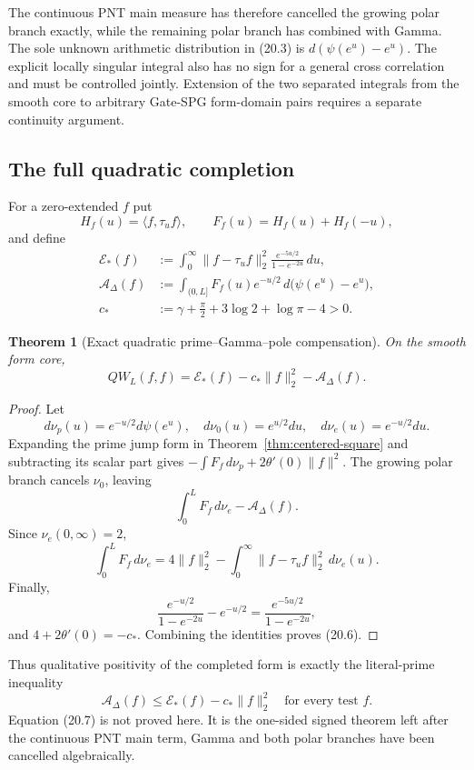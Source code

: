 \documentclass[11pt]{amsart}
\newtheorem{theorem}{Theorem}[section]
\theoremstyle{definition}
\theoremstyle{remark}
\begin{document}
The continuous PNT main measure has therefore cancelled the growing polar
branch exactly, while the remaining polar branch has combined with Gamma.
The sole unknown arithmetic distribution in (20.3) is
\(d(\psi(e^u)-e^u)\).  The explicit locally singular integral also has no
sign for a general cross correlation and must be controlled jointly.
Extension of the two separated integrals from the smooth core to arbitrary
Gate-SPG form-domain pairs requires a separate continuity argument.

\subsection*{The full quadratic completion}

For a zero-extended \(f\) put
\[
 H_f(u)=\langle f,\tau_uf\rangle,
 \qquad F_f(u)=H_f(u)+H_f(-u),
\]
and define
\[
\begin{aligned}
 \mathcal E_*(f)
 &:=
 \int_0^\infty\|f-\tau_uf\|_2^2
 \frac{e^{-5u/2}}{1-e^{-2u}}\,du,\\
 \mathcal A_\Delta(f)
 &:=
 \int_{(0,L]}F_f(u)e^{-u/2}\,
 d\bigl(\psi(e^u)-e^u\bigr),\\
 c_*&:=\gamma+\frac\pi2+3\log2+\log\pi-4>0.
\end{aligned}
\tag{20.5}
\]

\begin{theorem}[Exact quadratic prime--Gamma--pole compensation]
\label{thm:quadratic-compensation}
On the smooth form core,
\[
\boxed{
 QW_L(f,f)
 =
 \mathcal E_*(f)-c_*\|f\|_2^2-\mathcal A_\Delta(f).}
\tag{20.6}
\]
\end{theorem}

\begin{proof}
Let
\[
 d\nu_p(u)=e^{-u/2}d\psi(e^u),
 \quad d\nu_0(u)=e^{u/2}du,
 \quad d\nu_e(u)=e^{-u/2}du.
\]
Expanding the prime jump form in
Theorem~\ref{thm:centered-square} and subtracting its scalar part gives
\(-\int F_f\,d\nu_p+2\theta'(0)\|f\|^2\).  The growing polar branch cancels
\(\nu_0\), leaving
\[
 \int_0^LF_f\,d\nu_e-\mathcal A_\Delta(f).
\]
Since \(\nu_e(0,\infty)=2\),
\[
 \int_0^LF_f\,d\nu_e
 =4\|f\|_2^2-\int_0^\infty
 \|f-\tau_uf\|_2^2\,d\nu_e(u).
\]
Finally,
\[
 \frac{e^{-u/2}}{1-e^{-2u}}-e^{-u/2}
 =\frac{e^{-5u/2}}{1-e^{-2u}},
\]
and \(4+2\theta'(0)=-c_*\).  Combining the identities proves (20.6).
\end{proof}

Thus qualitative positivity of the completed form is exactly the
literal-prime inequality
\[
\boxed{
 \mathcal A_\Delta(f)
 \le\mathcal E_*(f)-c_*\|f\|_2^2
 \quad\text{for every test }f.}
\tag{20.7}
\]
Equation (20.7) is not proved here.  It is the one-sided signed theorem
left after the continuous PNT main term, Gamma and both polar branches have
been cancelled algebraically.
\end{document}
